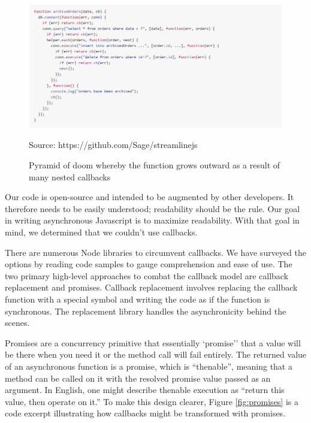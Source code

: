 \documentclass[pageno]{jpaper}
\newcommand{\source}[1]{\caption*{Source: {#1}} }
\begin{document}
\begin{figure}[h]
\begin{center}
\includegraphics[scale=0.5] {callback-hell}
\caption{Pyramid of doom whereby the function grows outward as a result of many nested callbacks}
\label{fig:callback-hell}
\source{https://github.com/Sage/streamlinejs}
\end{center}
\end{figure}

Our code is open-source and intended to be augmented by other developers. It therefore needs to be easily understood; readability should be the rule. Our goal in writing asynchronous Javascript is to maximize readability. With that goal in mind, we determined that we couldn't use callbacks. 

There are numerous Node libraries to circumvent callbacks. We have surveyed the options by reading code samples to gauge comprehension and ease of use. The two primary high-level approaches to combat the callback model are callback replacement and promises. Callback replacement involves replacing the callback function with a special symbol and writing the code as if the function is synchronous. The replacement library handles the asynchronicity behind the scenes. 

Promises are a concurrency primitive that essentially `promise'' that a value will be there when you need it or the method call will fail entirely. The returned value of an asynchronous function is a promise, which is ``thenable'', meaning that a method can be called on it with the resolved promise value passed as an argument. In English, one might describe thenable execution as ``return this value, then operate on it.'' To make this design clearer, Figure \ref{fig:promises} is a code excerpt illustrating how callbacks might be transformed with promises.
\end{document}
